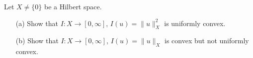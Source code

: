 \documentclass[12pt,a4paper]{article}
\begin{document}
Let $X\neq \{0\}$ be a Hilbert space.
\begin{enumerate}
    \item[(a)]
    Show that $I\colon X\to[0,\infty]$, 
    $I(u)=\|u\|^2_X$ is uniformly convex. 
    \item[(b)]
    Show that $I\colon X\to[0,\infty]$, 
    $I(u)=\|u\|_X$ is convex but not uniformly convex. 
\end{enumerate}
\end{document}
